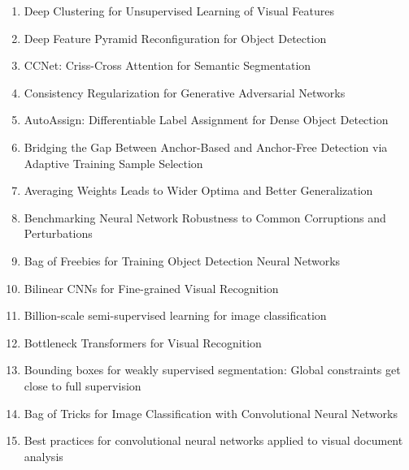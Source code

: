 \documentclass[acmlarge]{acmart}
\begin{document}
\begin{enumerate}
	\item Deep Clustering for Unsupervised Learning of Visual Features \cite{Caron2018DeepCF} 

	\item Deep Feature Pyramid Reconfiguration for Object Detection \cite{Kong2018DeepFP} 

	\item CCNet: Criss-Cross Attention for Semantic Segmentation \cite{Huang2019CCNetCA} 

	\item Consistency Regularization for Generative Adversarial Networks \cite{Zhang2020ConsistencyRF} 

	\item AutoAssign: Differentiable Label Assignment for Dense Object Detection \cite{Zhu2020AutoAssignDL} 

	\item Bridging the Gap Between Anchor-Based and Anchor-Free Detection via Adaptive Training Sample Selection \cite{Zhang2020BridgingTG} 

	\item Averaging Weights Leads to Wider Optima and Better Generalization \cite{Izmailov2018AveragingWL} 

	\item Benchmarking Neural Network Robustness to Common Corruptions and Perturbations \cite{Hendrycks2019BenchmarkingNN} 

	\item Bag of Freebies for Training Object Detection Neural Networks \cite{Zhang2019BagOF} 

	\item Bilinear CNNs for Fine-grained Visual Recognition \cite{Lin2015BilinearCF} 

	\item Billion-scale semi-supervised learning for image classification \cite{Yalniz2019BillionscaleSL} 

	\item Bottleneck Transformers for Visual Recognition \cite{Srinivas2021BottleneckTF} 

	\item Bounding boxes for weakly supervised segmentation: Global constraints get close to full supervision \cite{Kervadec2020BoundingBF} 

	\item Bag of Tricks for Image Classification with Convolutional Neural Networks \cite{He2019BagOT} 

	\item Best practices for convolutional neural networks applied to visual document analysis \cite{Simard2003BestPF} 


\end{enumerate}
\end{document}
